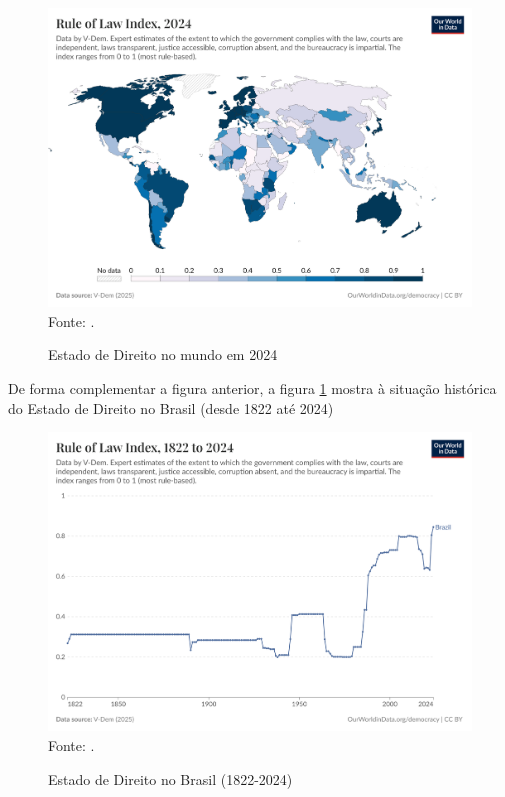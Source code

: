 \begin{figure}[H]
	\centering
	\caption{Estado de Direito no mundo em 2024}
	\includegraphics[width=1\linewidth]{figuras/rule-of-law-index.png}
	\label{fig:rule-of-law-index}
	\footnotesize{Fonte: \cite{rule-of-law-index}.}
\end{figure}

De forma complementar a figura anterior, a figura \ref{fig:rule-of-law-index} mostra à situação histórica do Estado de Direito no Brasil (desde 1822 até 2024)

\begin{figure}[H]
	\centering
	\caption{Estado de Direito no Brasil (1822-2024)}
	\includegraphics[width=1\linewidth]{figuras/rule-of-law-index-brazil.png}
	\label{fig:rule-of-law-index-brazil}
	\footnotesize{Fonte: \cite{rule-of-law-index}.}
\end{figure}

